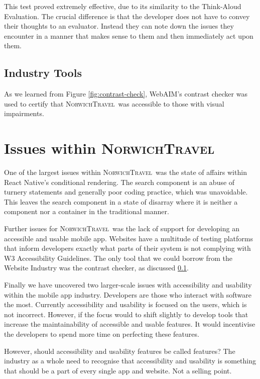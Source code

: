\documentclass[cmpstyle]{ueacmpstyle}
\newcommand{\nt}{\textsc{NorwichTravel}}
\begin{document}
		This test proved extremely effective, due to its similarity to the Think-Aloud Evaluation. The crucial difference is that the developer does not have to convey their thoughts to an evaluator. Instead they can note down the issues they encounter in a manner that makes sense to them and then immediately act upon them. 
		
		\subsection{Industry Tools} \label{sec:industry-tools}
		As we learned from Figure \ref{fig:contrast-check}, WebAIM's contrast checker was used to certify that \nt \ was accessible to those with visual impairments. 
		
	\section{Issues within \nt} \label{sec:major}
	One of the largest issues within \nt \ was the state of affairs within React Native's conditional rendering. The search component is an abuse of turnery statements and generally poor coding practice, which was unavoidable. This leaves the search component in a state of disarray where it is neither a component nor a container in the traditional manner.
	
	Further issues for \nt \ was the lack of support for developing an accessible and usable mobile app. Websites have a multitude of testing platforms that inform developers exactly what parts of their system is not complying with W3 Accessibility Guidelines. The only tool that we could borrow from the Website Industry was the contrast checker, as discussed \ref{sec:industry-tools}.
	
	Finally we have uncovered two larger-scale issues with accessibility and usability within the mobile app industry. Developers are those who interact with software the most. Currently accessibility and usability is focused on the users, which is not incorrect. However, if the focus would to shift slightly to develop tools that increase the maintainability of accessible and usable features. It would incentivise the developers to spend more time on perfecting these features.
	
	However, should accessibility and usability features be called features? The industry as a whole need to recognise that accessibility and usability is something that should be a part of every single app and website. Not a selling point.
\end{document}
